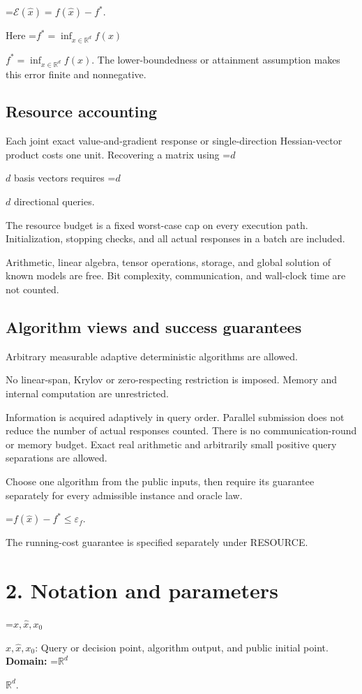 \documentclass[10pt,a4paper]{article}
\newcommand{\AtlasMath}[1]{\par\begingroup\centering\setbox0=\hbox{$\displaystyle #1$}\ifdim\wd0>1.4\linewidth\typeout{ATLAS WIDE FORMULA: \the\wd0}\fi\ifdim\wd0>\linewidth\resizebox{\linewidth}{!}{\box0}\else\box0\fi\par\endgroup}
\newcommand{\AtlasInlineMath}[1]{\begingroup\setbox0=\hbox{$#1$}\ifdim\wd0>.4\linewidth\endgroup\AtlasMath{#1}\else\endgroup$#1$\fi}
\begin{document}
\AtlasMath{\mathcal{E}(\widehat{x})=f(\widehat{x})-f^*.}


Here \AtlasInlineMath{f^*=\inf_{x\in \mathbb{R}^d}f(x)}. The lower-boundedness or attainment assumption makes this error finite and nonnegative.

\subsection{Resource accounting}
Each joint exact value-and-gradient response or single-direction Hessian-vector product costs one unit. Recovering a matrix using \AtlasInlineMath{d} basis vectors requires \AtlasInlineMath{d} directional queries.

The resource budget is a fixed worst-case cap on every execution path. Initialization, stopping checks, and all actual responses in a batch are included.

Arithmetic, linear algebra, tensor operations, storage, and global solution of known models are free. Bit complexity, communication, and wall-clock time are not counted.

\subsection{Algorithm views and success guarantees}
Arbitrary measurable adaptive deterministic algorithms are allowed.

No linear-span, Krylov or zero-respecting restriction is imposed. Memory and internal computation are unrestricted.

Information is acquired adaptively in query order. Parallel submission does not reduce the number of actual responses counted. There is no communication-round or memory budget. Exact real arithmetic and arbitrarily small positive query separations are allowed.

Choose one algorithm from the public inputs, then require its guarantee separately for every admissible instance and oracle law.


\AtlasMath{f(\widehat{x})-f^*\le \varepsilon_f.}


The running-cost guarantee is specified separately under RESOURCE.

\section{2. Notation and parameters}
\AtlasInlineMath{x,\widehat{x},x_0}: Query or decision point, algorithm output, and public initial point. \textbf{Domain:} \AtlasInlineMath{\mathbb{R}^d}.
\end{document}

